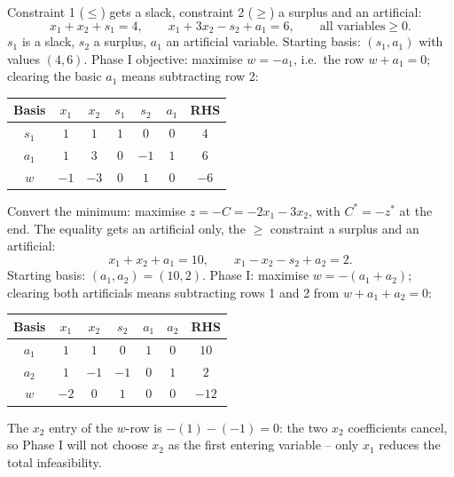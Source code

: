 \begin{solutions}
  \item Constraint 1 ($\le$) gets a slack, constraint 2 ($\ge$) a surplus
        and an artificial:
        \[
          x_{1}+x_{2}+s_{1}=4,\qquad
          x_{1}+3x_{2}-s_{2}+a_{1}=6,\qquad
          \text{all variables}\ge 0 .
        \]
        $s_{1}$ is a slack, $s_{2}$ a surplus, $a_{1}$ an artificial
        variable. Starting basis: $(s_{1},a_{1})$ with values $(4,6)$.
        Phase I objective: maximise $w=-a_{1}$, i.e.\ the row
        $w+a_{1}=0$; clearing the basic $a_{1}$ means subtracting row 2:
        \begin{center}
        \begin{tabular}{c|ccccc|c}
        Basis & $x_{1}$ & $x_{2}$ & $s_{1}$ & $s_{2}$ & $a_{1}$ & RHS\\
        \hline
        $s_{1}$ & $1$ & $1$ & $1$ & $0$ & $0$ & $4$\\
        $a_{1}$ & $1$ & $3$ & $0$ & $-1$ & $1$ & $6$\\
        \hline
        $w$ & $-1$ & $-3$ & $0$ & $1$ & $0$ & $-6$\\
        \end{tabular}
        \end{center}

  \item Convert the minimum: maximise $z=-C=-2x_{1}-3x_{2}$, with
        $C^{*}=-z^{*}$ at the end. The equality gets an artificial only,
        the $\ge$ constraint a surplus and an artificial:
        \[
          x_{1}+x_{2}+a_{1}=10,\qquad
          x_{1}-x_{2}-s_{2}+a_{2}=2 .
        \]
        Starting basis: $(a_{1},a_{2})=(10,2)$. Phase I: maximise
        $w=-(a_{1}+a_{2})$; clearing both artificials means subtracting
        rows 1 and 2 from $w+a_{1}+a_{2}=0$:
        \begin{center}
        \begin{tabular}{c|ccccc|c}
        Basis & $x_{1}$ & $x_{2}$ & $s_{2}$ & $a_{1}$ & $a_{2}$ & RHS\\
        \hline
        $a_{1}$ & $1$ & $1$ & $0$ & $1$ & $0$ & $10$\\
        $a_{2}$ & $1$ & $-1$ & $-1$ & $0$ & $1$ & $2$\\
        \hline
        $w$ & $-2$ & $0$ & $1$ & $0$ & $0$ & $-12$\\
        \end{tabular}
        \end{center}
        The $x_{2}$ entry of the $w$-row is $-(1)-(-1)=0$: the two $x_{2}$
        coefficients cancel, so Phase I will not choose $x_{2}$ as the
        first entering variable -- only $x_{1}$ reduces the total
        infeasibility.


\end{solutions}
